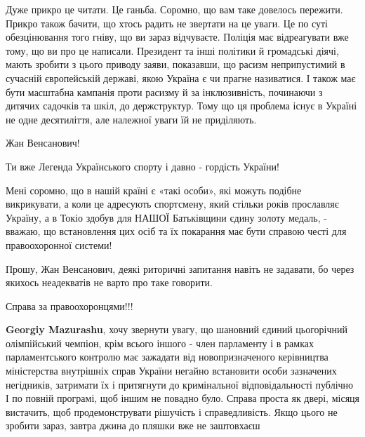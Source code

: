 \begin{itemize}
 

Дуже прикро це читати. Це ганьба. Соромно, що вам таке довелось пережити.
Прикро також бачити, що хтось радить не звертати на це уваги. Це по суті
обезцінювання того гніву, що ви зараз відчуваєте. Поліція має відреагувати вже
тому, що ви про це написали. Президент та інші політики й громадські діячі,
мають зробити з цього приводу заяви, показавши, що расизм неприпустимий в
сучасній європейській державі, якою Україна є чи прагне називатися. І також має
бути масштабна кампанія проти расизму й за інклюзивність, починаючи з дитячих
садочків та шкіл, до держструктур. Тому що ця проблема існує в Україні не одне
десятиліття, але належної уваги їй не приділяють.


 
Жан Венсанович!

Ти вже Легенда Українського спорту і давно - гордість України!

Мені соромно, що в нашій країні є «такі особи», які можуть подібне викрикувати,
а коли це адресують спортсмену, який стільки років прославляє Україну, а в
Токіо здобув для НАШОЇ Батьківщини єдину золоту медаль, - вважаю, що
встановлення цих осіб та їх покарання має бути справою честі для правоохоронної
системи!

Прошу, Жан Венсанович, деякі риторичні запитання навіть не задавати, бо через
якихось неадекватів не варто про таке говорити.

Справа за правоохоронцями!!!

\begin{itemize}
 
\textbf{Georgiy Mazurashu}, хочу звернути увагу, що шановний єдиний цьогорічний
олімпійський чемпіон, крім всього іншого - член парламенту і в рамках
парламентського контролю має зажадати від новопризначеного керівництва
міністерства внутрішніх справ України негайно встановити особи зазначених
негідників, затримати їх і притягнути до кримінальної відповідальності публічно
І по повній програмі, щоб іншим не повадно було. Справа проста як двері, місяця
вистачить, щоб продемонструвати рішучість і справедливість. Якщо цього не
зробити зараз, завтра джина до пляшки вже не заштовхаєш


\end{itemize}
\end{itemize}
